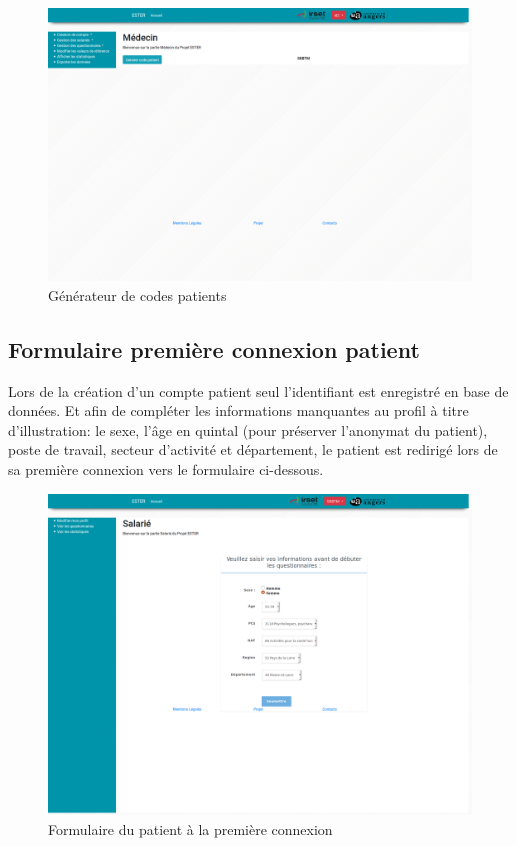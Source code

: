 \begin{figure}[H]
    \begin{center}
	\includegraphics[scale=0.25]{img/connexion/medecin}
    \end{center}
    \caption{Générateur de codes patients}
\end{figure}

\subsection{Formulaire première connexion patient}

Lors de la création d’un compte patient seul l’identifiant est enregistré en base de données. Et afin de compléter les informations manquantes au profil à titre d'illustration: le sexe, l’âge en quintal (pour préserver l’anonymat du patient), poste de travail, secteur d’activité et département, le patient est redirigé lors de sa première connexion vers le formulaire ci-dessous.

\begin{figure}[H]
    \begin{center}
	\includegraphics[scale=0.25]{img/connexion/formPatient}
    \end{center}
    \caption{Formulaire du patient à la première connexion}
\end{figure}
